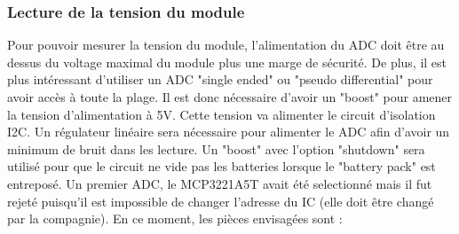 \documentclass[12pt,letterpaper]{article}
\begin{document}
\begin{normalsize}
				\subsubsection{Lecture de la tension du module}
					Pour pouvoir mesurer la tension du module, l'alimentation du ADC doit \^{e}tre au dessus du voltage maximal du module plus une marge de s\'{e}curit\'{e}. De plus, il est plus int\'{e}ressant d'utiliser un ADC "single ended" ou "pseudo differential" pour avoir acc\`{e}s \`{a} toute la plage. Il est donc n\'{e}cessaire d'avoir un "boost" pour amener la tension d'alimentation \`{a} 5V. Cette tension va alimenter le circuit d'isolation I2C. Un r\'{e}gulateur lin\'{e}aire sera n\'{e}cessaire pour alimenter le ADC afin d'avoir un minimum de bruit dans les lecture. Un "boost" avec l'option "shutdown" sera utilis\'{e} pour que le circuit ne vide pas les batteries lorsque le "battery pack" est entrepos\'{e}. Un premier ADC, le MCP3221A5T avait \'{e}t\'{e} selectionn\'{e} mais il fut rejet\'{e} puisqu'il est impossible de changer l'adresse du IC (elle doit \^{e}tre chang\'{e} par la compagnie). En ce moment, les pi\`{e}ces envisag\'{e}es sont : \\
					

\end{normalsize}
\end{document}
